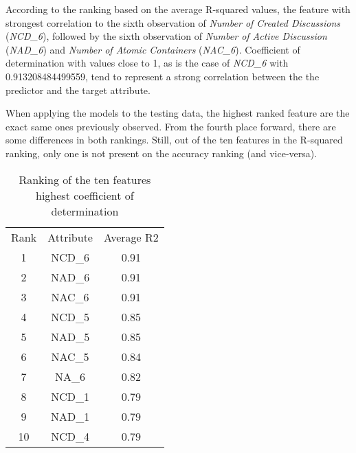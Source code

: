 \documentclass[11pt]{article}
\begin{document}
According to the ranking based on the average R-squared values, the feature with strongest correlation to the sixth observation of \textit{Number of Created Discussions} (\textit{NCD\_6}), followed by the sixth observation of \textit{Number of Active Discussion} (\textit{NAD\_6}) and \textit{Number of Atomic Containers} (\textit{NAC\_6}). Coefficient of determination with values close to 1, as is the case of \textit{NCD\_6} with 0.913208484499559, tend to represent a strong correlation between the the predictor and the target attribute.

When applying the models to the testing data, the highest ranked feature are the exact same ones previously observed. From the fourth place forward, there are some differences in both rankings. Still, out of the ten features in the R-squared ranking, only one is not present on the accuracy ranking (and vice-versa).
\begin{table}[h!]
\centering
\normalsize\begin{tabulary}{1.0\textwidth}{CCC}
Rank & Attribute & Average R2 \\
1 & NCD\_6 & 0.91 \\
2 & NAD\_6 & 0.91 \\
3 & NAC\_6 & 0.91 \\
4 & NCD\_5 & 0.85 \\
5 & NAD\_5 & 0.85 \\
6 & NAC\_5 & 0.84 \\
7 & NA\_6 & 0.82 \\
8 & NCD\_1 & 0.79 \\
9 & NAD\_1 & 0.79 \\
10 & NCD\_4 & 0.79 \\
\end{tabulary}
\caption{{Ranking of the ten features highest coefficient of determination
{\label{448570}}%
}}
\end{table}
\end{document}
